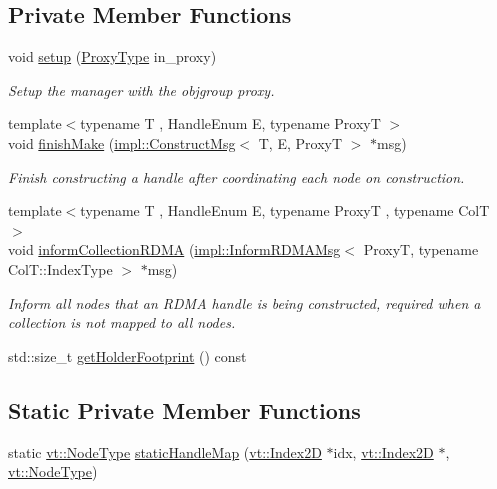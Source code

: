 \subsection*{Private Member Functions}
\begin{DoxyCompactItemize}
\item 
void \hyperlink{structvt_1_1rdma_1_1_manager_a15ba4b8e5b58df7f050fc1cdaf5f2bcd}{setup} (\hyperlink{structvt_1_1rdma_1_1_manager_a75d5cdc6428ea19f5ec665b04dcd7166}{Proxy\+Type} in\+\_\+proxy)
\begin{DoxyCompactList}\small\item\em Setup the manager with the objgroup proxy. \end{DoxyCompactList}\item 
{\footnotesize template$<$typename T , Handle\+Enum E, typename ProxyT $>$ }\\void \hyperlink{structvt_1_1rdma_1_1_manager_a462f2059efb91643275a921c84f72f67}{finish\+Make} (\hyperlink{structvt_1_1rdma_1_1impl_1_1_construct_msg}{impl\+::\+Construct\+Msg}$<$ T, E, ProxyT $>$ $\ast$msg)
\begin{DoxyCompactList}\small\item\em Finish constructing a handle after coordinating each node on construction. \end{DoxyCompactList}\item 
{\footnotesize template$<$typename T , Handle\+Enum E, typename ProxyT , typename ColT $>$ }\\void \hyperlink{structvt_1_1rdma_1_1_manager_a5dfbaf5c43691eaf3dcce5b14c4d8951}{inform\+Collection\+R\+D\+MA} (\hyperlink{structvt_1_1rdma_1_1impl_1_1_inform_r_d_m_a_msg}{impl\+::\+Inform\+R\+D\+M\+A\+Msg}$<$ ProxyT, typename Col\+T\+::\+Index\+Type $>$ $\ast$msg)
\begin{DoxyCompactList}\small\item\em Inform all nodes that an R\+D\+MA handle is being constructed, required when a collection is not mapped to all nodes. \end{DoxyCompactList}\item 
std\+::size\+\_\+t \hyperlink{structvt_1_1rdma_1_1_manager_a341e3d63c3834276b770c33ca6445188}{get\+Holder\+Footprint} () const
\end{DoxyCompactItemize}
\subsection*{Static Private Member Functions}
\begin{DoxyCompactItemize}
\item 
static \hyperlink{namespacevt_a866da9d0efc19c0a1ce79e9e492f47e2}{vt\+::\+Node\+Type} \hyperlink{structvt_1_1rdma_1_1_manager_a4a4972102f481ce6190cf8cf01a83cb8}{static\+Handle\+Map} (\hyperlink{namespacevt_a3bab786053b74a3d856fff1412ffa73a}{vt\+::\+Index2D} $\ast$idx, \hyperlink{namespacevt_a3bab786053b74a3d856fff1412ffa73a}{vt\+::\+Index2D} $\ast$, \hyperlink{namespacevt_a866da9d0efc19c0a1ce79e9e492f47e2}{vt\+::\+Node\+Type})
\end{DoxyCompactItemize}
